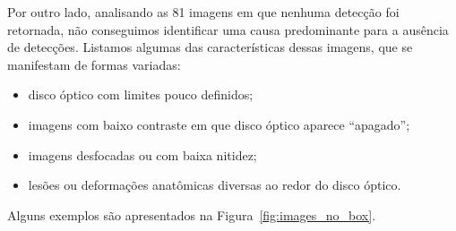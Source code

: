 \documentclass[12pt]{article}
\begin{document}
Por outro lado, analisando as 81 imagens em que nenhuma detecção foi retornada, não conseguimos identificar uma causa predominante para a ausência de detecções. Listamos algumas das características dessas imagens, que se manifestam de formas variadas:
\begin{itemize}[noitemsep,topsep=0pt]
    \item disco óptico com limites pouco definidos;
    \item imagens com baixo contraste em que disco óptico aparece ``apagado'';
    \item imagens desfocadas ou com baixa nitidez;
    \item lesões ou deformações anatômicas diversas ao redor do disco óptico.
\end{itemize}
Alguns exemplos são apresentados na Figura~\ref{fig:images_no_box}.
\end{document}
